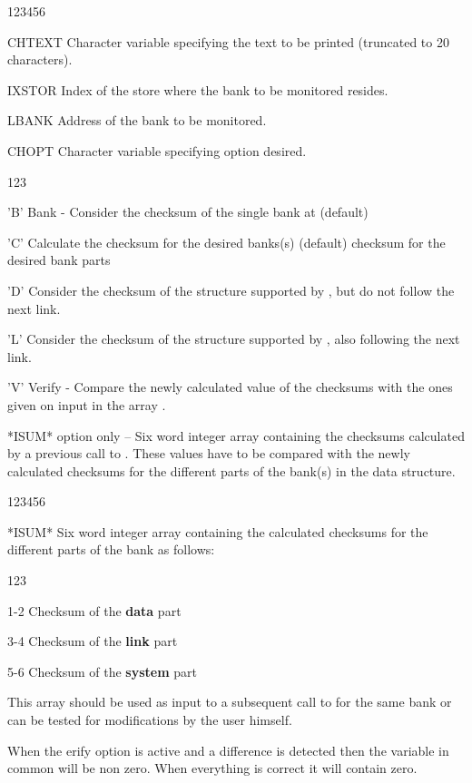 \Idesc
\begin{DLtt}{123456}
\item[CHTEXT]Character variable specifying the text to be printed
(truncated to 20 characters).
\item[IXSTOR]Index of the store where the bank to be monitored resides.
\item[LBANK]Address of the bank to be monitored.
\item[CHOPT]Character variable specifying option desired.
\begin{DLtt}{123}
\item['B']Bank - Consider the checksum of the single bank at  (default)
\item['C']Calculate the checksum for the desired banks(s) (default)
 checksum for the desired bank parts
\item['D']Consider the checksum of the
structure supported by , but do not follow the next link.
\item['L']Consider the checksum of the
structure supported by , also following the next link.
\item['V']Verify - Compare the newly calculated value of the checksums with the
ones given on input in the array .
\end{DLtt}
\item[*ISUM*] option only -- Six word integer array containing the
checksums calculated by a previous call to . These values have to
be compared with the newly calculated checksums for the different
parts of the bank(s) in the data structure.
\end{DLtt}
\Odesc
\begin{DLtt}{123456}
\item[*ISUM*]Six word integer array containing the calculated
checksums for the different parts of the bank as follows:
\begin{DLtt}{123}
\item[1-2]Checksum of the {\bf data} part
\item[3-4]Checksum of the {\bf link} part
\item[5-6]Checksum of the {\bf system} part
\end{DLtt}
This array should be used as input to a subsequent call to 
for the same bank or can be tested for modifications by the
user himself.
\end{DLtt}

When the erify option is active and a difference is detected
then the variable  in common \Lit{/\QUEST/}
will be non zero. When everything is correct it will contain zero.

